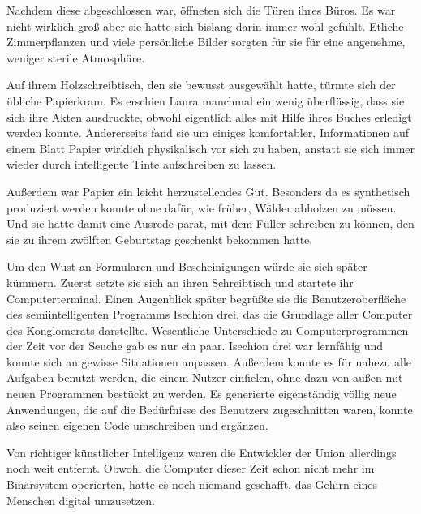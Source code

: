 Nachdem diese abgeschlossen war, öffneten sich die Türen ihres Büros. Es war nicht wirklich groß aber sie hatte sich bislang darin immer wohl gefühlt. Etliche Zimmerpflanzen und viele persönliche Bilder sorgten für sie für eine angenehme, weniger sterile Atmosphäre.

\par

Auf ihrem Holzschreibtisch, den sie bewusst ausgewählt hatte, türmte sich der übliche Papierkram. Es erschien Laura manchmal ein wenig überflüssig, dass sie sich ihre Akten ausdruckte, obwohl eigentlich alles mit Hilfe ihres Buches erledigt werden konnte. Andererseits fand sie um einiges komfortabler, Informationen auf einem Blatt Papier wirklich physikalisch vor sich zu haben, anstatt sie sich immer wieder durch intelligente Tinte aufschreiben zu lassen.

\par

Außerdem war Papier ein leicht herzustellendes Gut. Besonders da es synthetisch produziert werden konnte ohne dafür, wie früher, Wälder abholzen zu müssen. Und sie hatte damit eine Ausrede parat, mit dem Füller schreiben zu können, den sie zu ihrem zwölften Geburtstag geschenkt bekommen hatte.

\par

Um den Wust an Formularen und Bescheinigungen würde sie sich später kümmern. Zuerst setzte sie sich an ihren Schreibtisch und startete ihr Computerterminal. Einen Augenblick später begrüßte sie die Benutzeroberfläche des semiintelligenten Programms Isechion drei, das die Grundlage aller Computer des Konglomerats darstellte. Wesentliche Unterschiede zu Computerprogrammen der Zeit vor der Seuche gab es nur ein paar. Isechion drei war lernfähig und konnte sich an gewisse Situationen anpassen. Außerdem konnte es für nahezu alle Aufgaben benutzt werden, die einem Nutzer einfielen, ohne dazu von außen mit neuen Programmen bestückt zu werden. Es generierte eigenständig völlig neue Anwendungen, die auf die Bedürfnisse des Benutzers zugeschnitten waren, konnte also seinen eigenen Code umschreiben und ergänzen.

\par

Von richtiger künstlicher Intelligenz waren die Entwickler der Union allerdings noch weit entfernt. Obwohl die Computer dieser Zeit schon nicht mehr im Binärsystem operierten, hatte es noch niemand geschafft, das Gehirn eines Menschen digital umzusetzen.

